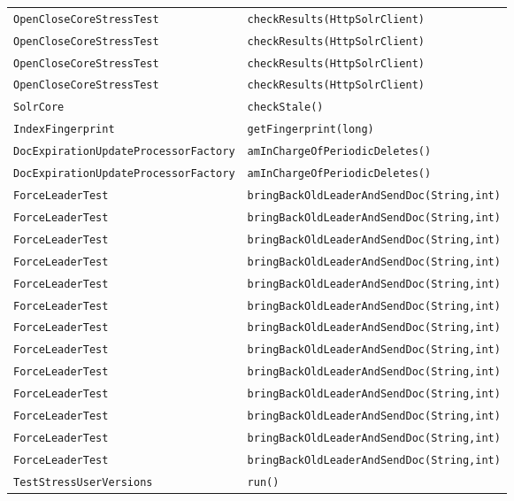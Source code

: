\begin{center}
\begin{longtable}{ll}
\lstinline/OpenCloseCoreStressTest/&{\lstinline/checkResults(HttpSolrClient)/}\\
\lstinline/OpenCloseCoreStressTest/&{\lstinline/checkResults(HttpSolrClient)/}\\
\lstinline/OpenCloseCoreStressTest/&{\lstinline/checkResults(HttpSolrClient)/}\\
\lstinline/OpenCloseCoreStressTest/&{\lstinline/checkResults(HttpSolrClient)/}\\
\lstinline/SolrCore/&{\lstinline/checkStale()/}\\
\lstinline/IndexFingerprint/&{\lstinline/getFingerprint(long)/}\\
\lstinline/DocExpirationUpdateProcessorFactory/&{\lstinline/amInChargeOfPeriodicDeletes()/}\\
\lstinline/DocExpirationUpdateProcessorFactory/&{\lstinline/amInChargeOfPeriodicDeletes()/}\\
\lstinline/ForceLeaderTest/&{\lstinline/bringBackOldLeaderAndSendDoc(String,int)/}\\
\lstinline/ForceLeaderTest/&{\lstinline/bringBackOldLeaderAndSendDoc(String,int)/}\\
\lstinline/ForceLeaderTest/&{\lstinline/bringBackOldLeaderAndSendDoc(String,int)/}\\
\lstinline/ForceLeaderTest/&{\lstinline/bringBackOldLeaderAndSendDoc(String,int)/}\\
\lstinline/ForceLeaderTest/&{\lstinline/bringBackOldLeaderAndSendDoc(String,int)/}\\
\lstinline/ForceLeaderTest/&{\lstinline/bringBackOldLeaderAndSendDoc(String,int)/}\\
\lstinline/ForceLeaderTest/&{\lstinline/bringBackOldLeaderAndSendDoc(String,int)/}\\
\lstinline/ForceLeaderTest/&{\lstinline/bringBackOldLeaderAndSendDoc(String,int)/}\\
\lstinline/ForceLeaderTest/&{\lstinline/bringBackOldLeaderAndSendDoc(String,int)/}\\
\lstinline/ForceLeaderTest/&{\lstinline/bringBackOldLeaderAndSendDoc(String,int)/}\\
\lstinline/ForceLeaderTest/&{\lstinline/bringBackOldLeaderAndSendDoc(String,int)/}\\
\lstinline/ForceLeaderTest/&{\lstinline/bringBackOldLeaderAndSendDoc(String,int)/}\\
\lstinline/ForceLeaderTest/&{\lstinline/bringBackOldLeaderAndSendDoc(String,int)/}\\
\lstinline/TestStressUserVersions/&{\lstinline/run()/}\\

\end{longtable}
\end{center}
